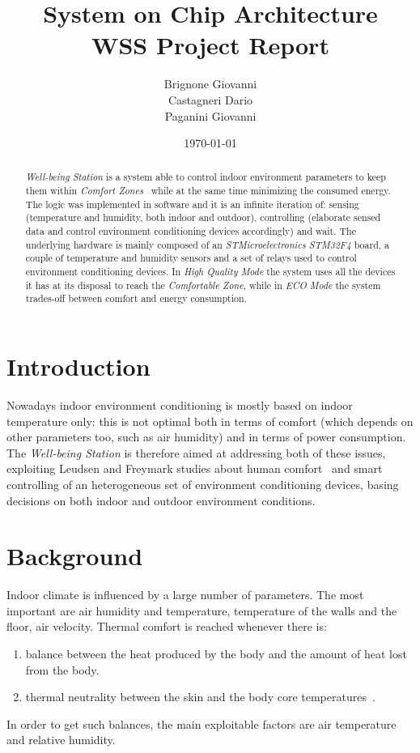 \documentclass[peerreview]{IEEEtran}
\begin{document}
\title{System on Chip Architecture \\ WSS Project Report}

\author{Brignone Giovanni \\ Castagneri Dario \\ Paganini Giovanni}
\date{\today}

\maketitle
\tableofcontents
\listoffigures

\IEEEpeerreviewmaketitle
\begin{abstract}
	\emph{Well-being Station} is a system able to control indoor environment
	parameters to keep them within \emph{Comfort Zones}~\cite{leudsen_freymark}
	while at the same time minimizing the consumed energy.
	The logic was implemented in software and it is an infinite iteration of:
	sensing (temperature and humidity, both indoor and outdoor), controlling
	(elaborate sensed data and control environment conditioning devices
	accordingly) and wait.
	The underlying hardware is mainly composed of an \emph{STMicroelectronics
	STM32F4} board, a couple of temperature and humidity sensors and a set
	of relays used to control environment conditioning devices.
	In \emph{High Quality Mode} the system uses all the devices it has at its
	disposal to reach the \emph{Comfortable Zone}, while in \emph{ECO Mode}
	the system trades-off between comfort and energy consumption.

\end{abstract}

\section{Introduction}
Nowadays indoor environment conditioning is mostly based on indoor temperature
only: this is not optimal both in terms of comfort (which depends on other
parameters too, such as air humidity) and in terms of power consumption.
The \emph{Well-being Station} is therefore aimed at addressing both of these issues,
exploiting Leudsen and Freymark studies about human comfort~\cite{leudsen_freymark}
and smart controlling of an heterogeneous set of environment conditioning devices,
basing decisions on both indoor and outdoor environment conditions.

\section{Background}
Indoor climate is influenced by a large number of parameters. The most
important are air humidity and temperature, temperature of the walls and the
floor, air velocity. Thermal comfort is reached whenever there is:
\begin{enumerate}
	\item balance between the heat produced by the body and the
		amount of heat lost from the body.
	\item thermal neutrality between the skin and the body core temperatures~\cite{indoor_comfort}. 
\end{enumerate}
In order to get such balances, the main exploitable factors are air temperature
and relative humidity.
\end{document}

